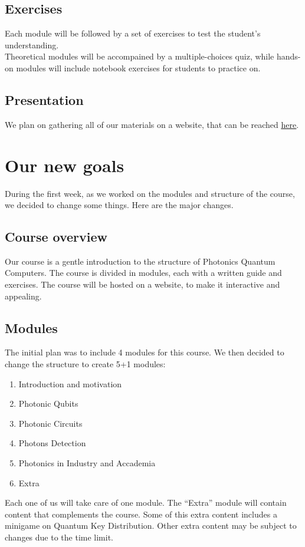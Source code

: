 \documentclass[hidelinks, a4paper,12pt]{article}
\begin{document}
\subsection{Exercises}
Each module will be followed by a set of exercises to test the student's understanding.\\ Theoretical modules will be accompained by a multiple-choices quiz, while hands-on modules will include notebook exercises for students to practice on.

\subsection{Presentation}
We plan on gathering all of our materials on a website, that can be reached \href{https://cosmcif.github.io/photonics-qworld-challenge/index.html}{\underline{here}}.
\newpage
\section{Our new goals}
During the first week, as we worked on the modules and structure of the course, we decided to change some things. Here are the major changes.
\subsection{Course overview}
Our course is a gentle introduction to the structure of Photonics Quantum Computers. The course is divided in modules, each with a written guide and exercises. The course will be hosted on a website, to make it interactive and appealing.
\subsection{Modules}
The initial plan was to include 4 modules for this course. We then decided to change the structure to create 5+1 modules:
\begin{enumerate}
  \item Introduction and motivation
  \item Photonic Qubits
  \item Photonic Circuits
  \item Photons Detection
  \item Photonics in Industry and Accademia
  \item Extra
\end{enumerate}
Each one of us will take care of one module. The ``Extra'' module will contain content that complements the course. Some of this extra content includes a minigame on Quantum Key Distribution. Other extra content may be subject to changes due to the time limit.
\end{document}
